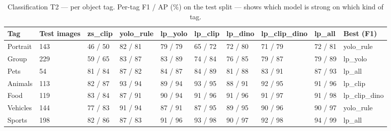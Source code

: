 \begin{table}[ht]
\centering
\small
\caption{Classification T2 — per object tag. Per-tag F1 / AP (\%) on the test split — shows which model is strong on which kind of tag.}
\begin{tabular}{llllllllll}
\toprule
Tag & Test images & zs\_clip & yolo\_rule & lp\_yolo & lp\_clip & lp\_dino & lp\_clip\_dino & lp\_all & Best (F1) \\
\midrule
Portrait & 143 & 46 / 50 & 82 / 81 & 79 / 79 & 65 / 72 & 72 / 80 & 71 / 79 & 72 / 81 & yolo\_rule \\
Group & 229 & 59 / 65 & 83 / 87 & 83 / 89 & 74 / 84 & 76 / 85 & 79 / 87 & 79 / 89 & lp\_yolo \\
Pets & 54 & 81 / 84 & 87 / 82 & 84 / 87 & 84 / 89 & 81 / 88 & 83 / 91 & 87 / 93 & lp\_all \\
Animals & 113 & 82 / 87 & 93 / 94 & 89 / 94 & 93 / 95 & 88 / 91 & 92 / 95 & 91 / 96 & lp\_clip \\
Food & 119 & 83 / 84 & 87 / 91 & 90 / 94 & 91 / 96 & 91 / 96 & 91 / 97 & 91 / 98 & lp\_clip\_dino \\
Vehicles & 144 & 77 / 83 & 91 / 94 & 87 / 91 & 87 / 95 & 89 / 95 & 90 / 96 & 90 / 97 & yolo\_rule \\
Sports & 198 & 82 / 86 & 87 / 83 & 91 / 96 & 93 / 98 & 90 / 97 & 92 / 98 & 94 / 99 & lp\_all \\
\bottomrule
\end{tabular}
\end{table}
